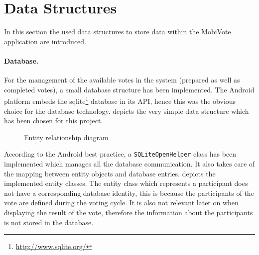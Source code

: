 \documentclass[numbers=noenddot, abstract=on, a4paper, headsepline,
footsepline, oneside, openright, draft=off, listof=leveldown]{scrreprt}
\begin{document}
\section{Data Structures} 
\label{sec:datastructures}
In this section the used data structures to store data within the MobiVote
application are introduced.

\paragraph{Database.} For the management of the available votes in the system
(prepared as well as completed votes), a small database structure has been implemented. The Android
platform embeds the sqlite\footnote{\url{http://www.sqlite.org/}} database in
its API, hence this was the obvious choice for the database technology.  depicts the very simple data
structure which has been chosen for this project.

\begin{figure}[htbp]
	\centering
	\caption{Entity relationship diagram}
	\label{fig:erd}
\end{figure}

According to the Android best practice, a \texttt{SQLiteOpenHelper} class has
been implemented which manages all the database communication. It also takes
care of the mapping between entity objects and database entries.
 depicts the implemented entity classes. The entity class
which represents a participant does not have a corresponding database identity,
this is because the participants of the vote are defined during the voting
cycle.
It is also not relevant later on when displaying the result of the vote,
therefore the information about the participants is not stored in the database.
\end{document}
